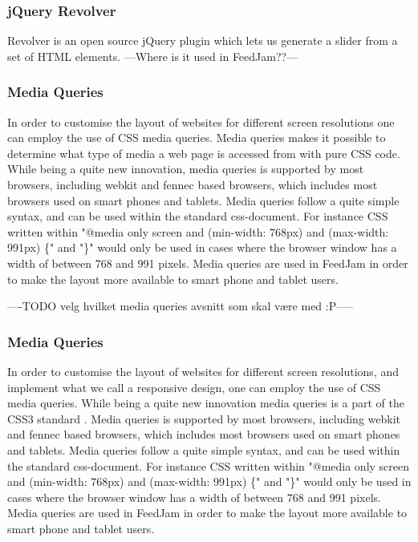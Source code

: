 \subsubsection{jQuery Revolver}
Revolver is an open source jQuery plugin which lets us generate a slider from a set of HTML elements. ---Where is it used in FeedJam??---

\subsubsection{Media Queries} %
In order to customise the layout of websites for different screen resolutions one can employ the use of CSS media queries. Media queries makes it possible to determine what type of media a web page is accessed from with pure CSS code. While being a quite new innovation, media queries is supported by most browsers, including webkit and fennec based browsers, which includes most browsers used on smart phones and tablets. Media queries follow a quite simple syntax, and can be used within the standard css-document. For instance CSS written within "@media only screen and (min-width: 768px) and (max-width: 991px) \{" and "\}" would only be used in cases where the browser window has a width of between 768 and 991 pixels. Media queries are used in FeedJam in order to make the layout more available to smart phone and tablet users.

----TODO velg hvilket media queries avsnitt som skal være med :P-----

\subsubsection{Media Queries} %
In order to customise the layout of websites for different screen resolutions, and implement what we call a responsive design, one can employ the use of CSS media queries. While being a quite new innovation media queries is a part of the CSS3 standard \cite{W3C}. Media queries is supported by most browsers, including webkit and fennec based browsers, which includes most browsers used on smart phones and tablets. Media queries follow a quite simple syntax, and can be used within the standard css-document. For instance CSS written within "@media only screen and (min-width: 768px) and (max-width: 991px) \{" and "\}" would only be used in cases where the browser window has a width of between 768 and 991 pixels. Media queries are used in FeedJam in order to make the layout more available to smart phone and tablet users.



